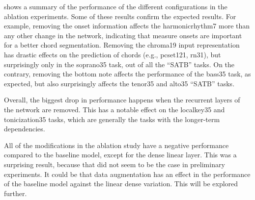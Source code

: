 

 shows a summary of the performance of the
different configurations in the ablation experiments. Some
of these results confirm the expected results. For example,
removing the onset information affects the
\gls{harmonicrhythm7} more than any other change in the
network, indicating that measure onsets are important for a
better chord segmentation. Removing the \gls{chroma19} input
representation has drastic effects on the prediction of
chords (e.g., \gls{pcset121}, \gls{rn31}), but surprisingly
only in the \gls{soprano35} task, out of all the ``SATB''
tasks. On the contrary, removing the bottom note affects the
performance of the \gls{bass35} task, as expected, but also
surprisingly affects the \gls{tenor35} and \gls{alto35}
``SATB'' tasks.

Overall, the biggest drop in performance happens when the
recurrent layers of the network are removed. This has a
notable effect on the \gls{localkey35} and
\gls{tonicization35} tasks, which are generally the tasks
with the longer-term dependencies. 

All of the modifications in the ablation study have a
negative performance compared to the baseline model, except
for the dense linear layer. This was a surprising result,
because that did not seem to be the case in preliminary
experiments. It could be that data augmentation has an
effect in the performance of the baseline model against the
linear dense variation. This will be explored further.

